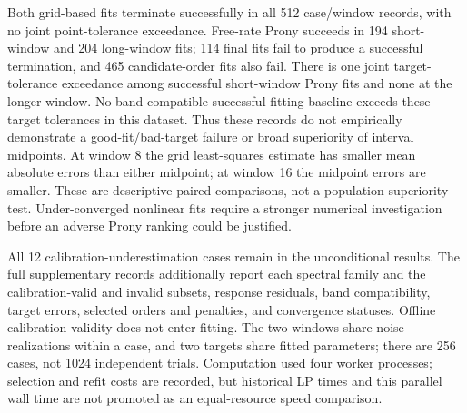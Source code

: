 Both grid-based fits terminate successfully in all 512 case/window records, with no joint point-tolerance exceedance. Free-rate Prony succeeds in 194 short-window and 204 long-window fits; 114 final fits fail to produce a successful termination, and 465 candidate-order fits also fail. There is one joint target-tolerance exceedance among successful short-window Prony fits and none at the longer window. No band-compatible successful fitting baseline exceeds these target tolerances in this dataset. Thus these records do not empirically demonstrate a good-fit/bad-target failure or broad superiority of interval midpoints. At window 8 the grid least-squares estimate has smaller mean absolute errors than either midpoint; at window 16 the midpoint errors are smaller. These are descriptive paired comparisons, not a population superiority test. Under-converged nonlinear fits require a stronger numerical investigation before an adverse Prony ranking could be justified.

All 12 calibration-underestimation cases remain in the unconditional results. The full supplementary records additionally report each spectral family and the calibration-valid and invalid subsets, response residuals, band compatibility, target errors, selected orders and penalties, and convergence statuses. Offline calibration validity does not enter fitting. The two windows share noise realizations within a case, and two targets share fitted parameters; there are 256 cases, not 1024 independent trials. Computation used four worker processes; selection and refit costs are recorded, but historical LP times and this parallel wall time are not promoted as an equal-resource speed comparison.
